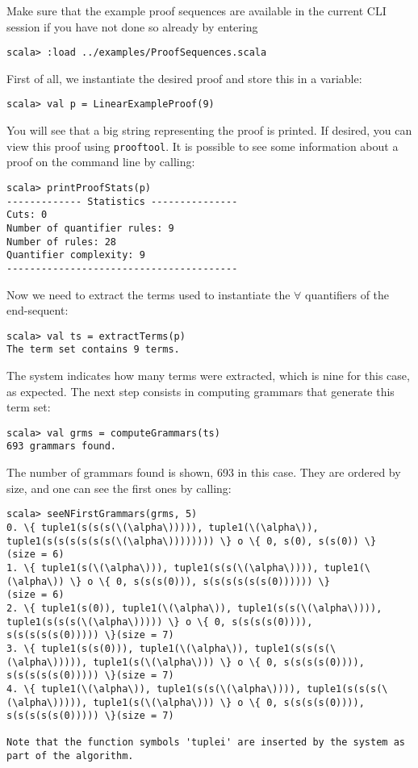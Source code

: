 \documentclass[a4paper,11pt]{article}
\begin{document}
Make sure that the example proof sequences are available in the current CLI
session if you have not done so already by entering
\begin{lstlisting}
scala> :load ../examples/ProofSequences.scala
\end{lstlisting}
%
First of all, we instantiate the desired proof and store this in a variable:
\begin{lstlisting}
scala> val p = LinearExampleProof(9) 
\end{lstlisting}

You will see that a big string representing the proof is printed. If desired,
you can view this proof using \texttt{prooftool}. 
It is possible to see some information about a proof on the command line by calling:
\begin{lstlisting}
scala> printProofStats(p)
------------- Statistics ---------------
Cuts: 0
Number of quantifier rules: 9
Number of rules: 28
Quantifier complexity: 9
----------------------------------------
\end{lstlisting}
Now we need to
extract the terms used to instantiate the $\forall$ quantifiers of the
end-sequent:
\begin{lstlisting}
scala> val ts = extractTerms(p)
The term set contains 9 terms.
\end{lstlisting}
The system indicates how many terms were extracted, which is nine for this case,
as expected. The next step consists in computing grammars that generate this
term set:
\begin{lstlisting}
scala> val grms = computeGrammars(ts)
693 grammars found.
\end{lstlisting}
The number of grammars found is shown, 693 in this case. They are ordered
by size, and one can see the first ones by calling:
\begin{lstlisting}
scala> seeNFirstGrammars(grms, 5)
0. \{ tuple1(s(s(s(\(\alpha\))))), tuple1(\(\alpha\)), tuple1(s(s(s(s(s(s(\(\alpha\)))))))) \} o \{ 0, s(0), s(s(0)) \}
(size = 6)
1. \{ tuple1(s(\(\alpha\))), tuple1(s(s(\(\alpha\)))), tuple1(\(\alpha\)) \} o \{ 0, s(s(s(0))), s(s(s(s(s(s(0)))))) \}
(size = 6)
2. \{ tuple1(s(0)), tuple1(\(\alpha\)), tuple1(s(s(\(\alpha\)))), tuple1(s(s(s(\(\alpha\))))) \} o \{ 0, s(s(s(s(0)))), 
s(s(s(s(s(0))))) \}(size = 7)
3. \{ tuple1(s(s(0))), tuple1(\(\alpha\)), tuple1(s(s(s(\(\alpha\))))), tuple1(s(\(\alpha\))) \} o \{ 0, s(s(s(s(0)))), 
s(s(s(s(s(0))))) \}(size = 7)
4. \{ tuple1(\(\alpha\)), tuple1(s(s(\(\alpha\)))), tuple1(s(s(s(\(\alpha\))))), tuple1(s(\(\alpha\))) \} o \{ 0, s(s(s(s(0)))), 
s(s(s(s(s(0))))) \}(size = 7)

Note that the function symbols 'tuplei' are inserted by the system as part of the algorithm.
\end{lstlisting}
\end{document}
